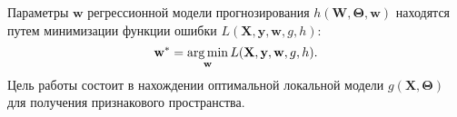\documentclass[12pt,twoside]{article}
\begin{document}
Параметры $\mathbf{w}$ регрессионной модели прогнозирования $h(\mathbf{W}, \mathbf{\Theta}, \mathbf{w})$ находятся путем минимизации функции ошибки $L(\mathbf{X}, \mathbf{y}, \mathbf{w}, g, h)$:
\begin{equation}
\mathbf{w^*} = \argmin_{\mathbf{w}} L(\mathbf{X}, \mathbf{y}, \mathbf{w}, g, h).
\end{equation}
Цель работы состоит в нахождении оптимальной локальной модели $g(\mathbf{X}, \mathbf{\Theta})$ для получения признакового пространства.


\end{document}

